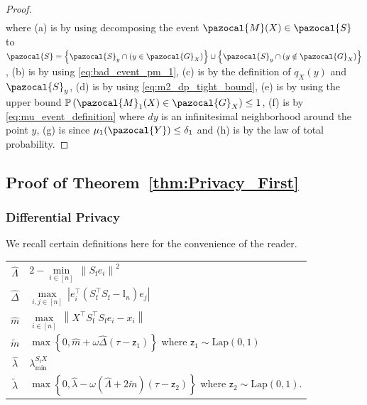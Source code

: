 \documentclass[11pt]{article}
\theoremstyle{definition}
\theoremstyle{plain}
\providecommand{\theoremref}[1]{Theorem~\ref{#1}}
\providecommand{\brI}{\mathbb{I}}
\newcommand{\abs}[1]{\left| #1 \right|}
\newcommand{\Norm}[1]{\left\| #1 \right\|}
\providecommand{\norm}[1]{\Norm{#1}}
\newcommand{\pG}{\pazocal{G}}
\newcommand{\pM}{\pazocal{M}}
\newcommand{\pS}{\pazocal{S}}
\newcommand{\pY}{\pazocal{Y}}
\begin{document}
\begin{proof}
\begin{align}
    \end{align}
    where (a) is by using decomposing the event $\pM(X)\in \pS$ to $\pS = \left\{\pS_y \cap \left(y\in\pG_X\right)\right\} \cup \left\{\pS_y \cap \left(y\notin\pG_X\right)\right\}$, (b) is by using \eqref{eq:bad_event_pm_1}, (c) is by the definition of $q_X(y)$ and $\pS_y$, (d) is by using \eqref{eq:m2_dp_tight_bound}, (e) is by using the upper bound $\mathbb{P}\left(\pM_1(X) \in \pG_X\right) \leq 1$, (f) is by \eqref{eq:mu_event_definition} where $dy$ is an infinitesimal neighborhood around the point $y$, (g) is since $\mu_1(\pY) \leq \delta_1$ and (h) is by the law of total probability. 
\end{proof}
\subsection{Proof of \theoremref{thm:Privacy_First}}
\label{app:prof_theorem_1} 

\subsubsection{Differential Privacy}
\label{app:DP_guarantee_fastmix}
We recall certain definitions here for the convenience of the reader.
\begin{center}
\renewcommand{\arraystretch}{1.5}
\begin{tabular}{c|l}
    \(\widehat{\Lambda}\) & \(2 - \underset{i \in [n]}{\min}\  \norm{S_{\mathrm{f}}e_{i}}^{2}\) \\
    \(\widehat{\Delta}\) & \(\underset{i, j \in [n]}{\max}\ \abs{e_{i}^{\top}(S_{\mathrm{f}}^{\top}S_{\mathrm{f}} - \brI_{n})e_{j}}\) \\
    \(\widehat{m}\) & \(\underset{i \in [n]}{\max}\  \norm{X^{\top}S_{\mathrm{f}}^{\top}S_{\mathrm{f}}e_{i} - x_{i}}\) \\
    \(\widetilde{m}\) & \(\max\left\{0, \widehat{m} + \omega \widehat{\Delta}(\tau - \mathsf{z}_{1})\right\}\) where \(\mathsf{z}_{1} \sim \mathrm{Lap}(0, 1)\) \\
     $\widehat{\lambda}$ & $\lambda^{S_{\mathrm{f}}X}_{\min}$\\
    \(\widetilde{\lambda}\) & \(\max\left\{0, \widehat{\lambda} - \omega(\widehat{\Lambda} + 2\widetilde{m})(\tau - \mathsf{z}_{2})\right\}\) where  \(\mathsf{z}_{2} \sim \mathrm{Lap}(0, 1)\).
\end{tabular}
\end{center}
\end{document}
